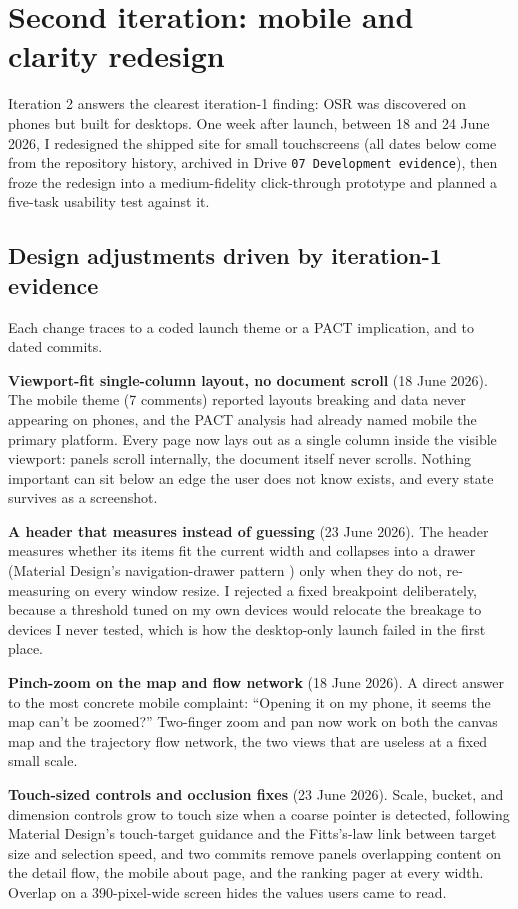 \section{Second iteration: mobile and clarity redesign}
\label{sec:iteration2}

Iteration 2 answers the clearest iteration-1 finding: OSR was discovered on phones but built for desktops. One week after launch, between 18 and 24 June 2026, I redesigned the shipped site for small touchscreens (all dates below come from the repository history, archived in Drive \texttt{07 Development evidence}), then froze the redesign into a medium-fidelity click-through prototype and planned a five-task usability test against it.

\subsection{Design adjustments driven by iteration-1 evidence}

Each change traces to a coded launch theme or a PACT implication, and to dated commits.

\textbf{Viewport-fit single-column layout, no document scroll} (18 June 2026). The mobile theme (7 comments) reported layouts breaking and data never appearing on phones, and the PACT analysis had already named mobile the primary platform. Every page now lays out as a single column inside the visible viewport: panels scroll internally, the document itself never scrolls. Nothing important can sit below an edge the user does not know exists, and every state survives as a screenshot.

\textbf{A header that measures instead of guessing} (23 June 2026). The header measures whether its items fit the current width and collapses into a drawer (Material Design's navigation-drawer pattern \cite{materialdesign}) only when they do not, re-measuring on every window resize. I rejected a fixed breakpoint deliberately, because a threshold tuned on my own devices would relocate the breakage to devices I never tested, which is how the desktop-only launch failed in the first place.

\textbf{Pinch-zoom on the map and flow network} (18 June 2026). A direct answer to the most concrete mobile complaint: ``Opening it on my phone, it seems the map can't be zoomed?'' Two-finger zoom and pan now work on both the canvas map and the trajectory flow network, the two views that are useless at a fixed small scale.

\textbf{Touch-sized controls and occlusion fixes} (23 June 2026). Scale, bucket, and dimension controls grow to touch size when a coarse pointer is detected, following Material Design's touch-target guidance and the Fitts's-law link \cite{fitts1954} between target size and selection speed, and two commits remove panels overlapping content on the detail flow, the mobile about page, and the ranking pager at every width. Overlap on a 390-pixel-wide screen hides the values users came to read.

